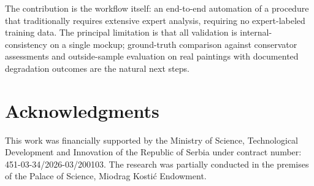 \documentclass[conference]{IEEEtran}
\begin{document}
The contribution is the workflow itself: an end-to-end automation of a procedure that traditionally requires extensive expert analysis, requiring no expert-labeled training data. The principal limitation is that all validation is internal-consistency on a single mockup; ground-truth comparison against conservator assessments and outside-sample evaluation on real paintings with documented degradation outcomes are the natural next steps.

\section*{Acknowledgments}

This work was financially supported by the Ministry of Science, Technological Development and Innovation of the Republic of Serbia under contract number: 451-03-34/2026-03/200103.
The research was partially conducted in the premises of the Palace of Science, Miodrag Kostić Endowment.
\end{document}
